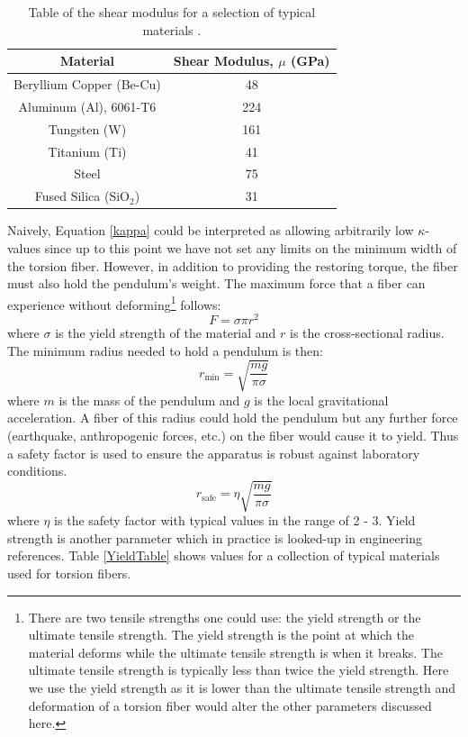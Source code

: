 \documentclass{book}
\begin{document}
\begin{center}		
	\begingroup
	\setlength{\tabcolsep}{10pt} %
	\renewcommand{\arraystretch}{1.5} %
	\begin{table}[ht!]
		\begin{center}
			\begin{tabular}{ |c|c| }
				\hline
				Material & Shear Modulus, $\mu$ (GPa) \\
				\hline
				Beryllium Copper (Be-Cu) & 48\\
				Aluminum (Al), 6061-T6 & 224\\
				Tungsten (W) & 161 \\ 
				Titanium (Ti) & 41\\
				Steel & 75\\
				Fused Silica (SiO$_2$) & 31 \\
				\hline
				
			\end{tabular}
			\caption{Table of the shear modulus for a selection of typical materials \cite{shear, quartz}.}\label{ShearTable}
		\end{center}
	\end{table}
	\endgroup
\end{center}

Naively, Equation \ref{kappa} could be interpreted as allowing arbitrarily low $\kappa$-values since up to this point we have not set any limits on the minimum width of the torsion fiber. However, in addition to providing the restoring torque, the fiber must also hold the pendulum's weight. The maximum force that a fiber can experience without deforming\footnote{There are two tensile strengths one could use: the yield strength or the ultimate tensile strength. The yield strength is the point at which the material deforms while the ultimate tensile strength is when it breaks. The ultimate tensile strength is typically less than twice the yield strength. Here we use the yield strength as it is lower than the ultimate tensile strength and deformation of a torsion fiber would alter the other parameters discussed here.} follows:
\begin{equation}
F=\sigma \pi r^2
\end{equation}
where $\sigma$ is the yield strength of the material and $r$ is the cross-sectional radius. The minimum radius needed to hold a pendulum is then:
\begin{equation}
r_{\text{min}}=\sqrt{\frac{m g}{\pi \sigma}}
\end{equation}
where $m$ is the mass of the pendulum and $g$ is the local gravitational acceleration. A fiber of this radius could hold the pendulum but any further force (earthquake, anthropogenic forces, etc.) on the fiber would cause it to yield. Thus a safety factor is used to ensure the apparatus is robust against laboratory conditions.
\begin{equation}
r_{\text{safe}}=\eta \sqrt{\frac{m g}{\pi \sigma}}
\end{equation}
where $\eta$ is the safety factor with typical values in the range of 2 - 3. Yield strength is another parameter which in practice is looked-up in engineering references. Table \ref{YieldTable} shows values for a collection of typical materials used for torsion fibers.
\end{document}
